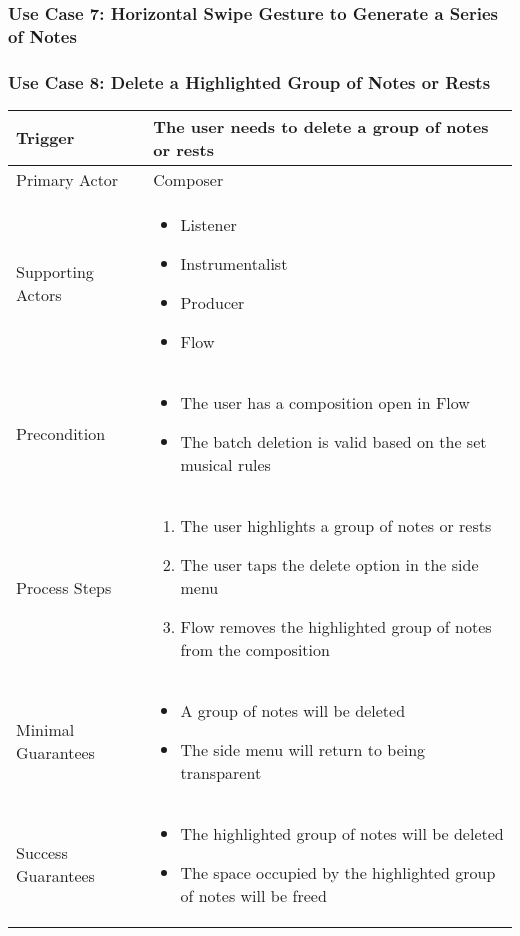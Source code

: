 \subsubsection{Use Case 7: Horizontal Swipe Gesture to Generate a Series of Notes}


\subsubsection{Use Case 8: Delete a Highlighted Group of Notes or Rests}

\begin{tabularx}{\textwidth}{|X|X|}
\hline
Trigger & 
The user needs to delete a group of notes or rests \\
\hline
Primary Actor & 
Composer \\
\hline
Supporting Actors & 
\begin{itemize}
\item Listener
\item Instrumentalist
\item Producer
\item Flow
\end{itemize} \\
\hline
Precondition & 
\begin{itemize}
\item The user has a composition open in Flow
\item The batch deletion is valid based on the set musical rules
\end{itemize} \\
\hline
Process Steps & 
\begin{enumerate}
\item The user highlights a group of notes or rests
\item The user taps the delete option in the side menu
\item Flow removes the highlighted group of notes from the composition
\end{enumerate} \\
\hline
Minimal Guarantees & 
\begin{itemize}
  \item A group of notes will be deleted
  \item The side menu will return to being transparent
\end{itemize} \\
\hline
Success Guarantees & 
\begin{itemize}
  \item The highlighted group of notes will be deleted 
  \item The space occupied by the highlighted group of notes will be freed
\end{itemize} \\
\hline
\end{tabularx}

